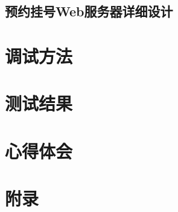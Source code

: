\documentclass[UTF8,12pt]{article}
\begin{document}
\newpage

\subsection{预约挂号Web服务器详细设计}

\newpage

\section{调试方法}

\newpage

\section{测试结果}

\newpage

\section{心得体会}

\newpage

\section{附录}

\newpage
\end{document}
